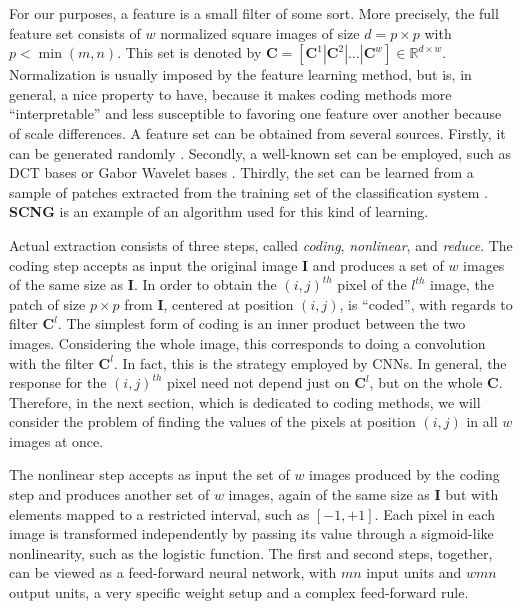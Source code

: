 \documentclass[runningheads,a4paper]{llncs}
\newcommand{\hctimes}[2]{{#1}\!\times\!{#2}}
\begin{document}
For our purposes, a feature is a small filter of some sort. More precisely, the full feature set consists of $w$ normalized square images of size $d = \hctimes{p}{p}$ with $p < \min(m,n)$. This set is denoted by $\textbf{C} = \left[ \textbf{C}^1 \left|\right. \textbf{C}^2 \left|\right. \dots \left|\right. \textbf{C}^w \right] \in \mathbb{R}^{\hctimes{d}{w}}$. Normalization is usually imposed by the feature learning method, but is, in general, a nice property to have, because it makes coding methods more ``interpretable'' and less susceptible to favoring one feature over another because of scale differences. A feature set can be obtained from several sources. Firstly, it can be generated randomly \cite{random-weights-feature-learning}. Secondly, a well-known set can be employed, such as DCT bases or Gabor Wavelet bases \cite{simple-method-sparse-coding}. Thirdly, the set can be learned from a sample of patches extracted from the training set of the classification system \cite{emergence-sparse-coding,sparse-coding-strategy-V1,tiny-images}. \textbf{SCNG} is an example of an algorithm used for this kind of learning.

Actual extraction consists of three steps, called \emph{coding}, \emph{nonlinear}, and \emph{reduce}. The coding step accepts as input the original image $\textbf{I}$ and produces a set of $w$ images of the same size as $\textbf{I}$. In order to obtain the $(i,j)^{th}$ pixel of the $l^{th}$ image, the patch of size $\hctimes{p}{p}$ from $\textbf{I}$, centered at position $(i,j)$, is ``coded'', with regards to filter $\textbf{C}^l$. The simplest form of coding is an inner product between the two images. Considering the whole image, this corresponds to doing a convolution with the filter $\textbf{C}^l$. In fact, this is the strategy employed by CNNs. In general, the response for the $(i,j)^{th}$ pixel need not depend just on $\textbf{C}^l$, but on the whole $\textbf{C}$. Therefore, in the next section, which is dedicated to coding methods, we will consider the problem of finding the values of the pixels at position $(i,j)$ in all $w$ images at once.

The nonlinear step accepts as input the set of $w$ images produced by the coding step and produces another set of $w$ images, again of the same size as $\textbf{I}$ but with elements mapped to a restricted interval, such as $[-1,+1]$. Each pixel in each image is transformed independently by passing its value through a sigmoid-like nonlinearity, such as the logistic function. The first and second steps, together, can be viewed as a feed-forward neural network, with $mn$ input units and $wmn$ output units, a very specific weight setup and a complex feed-forward rule.
\end{document}
